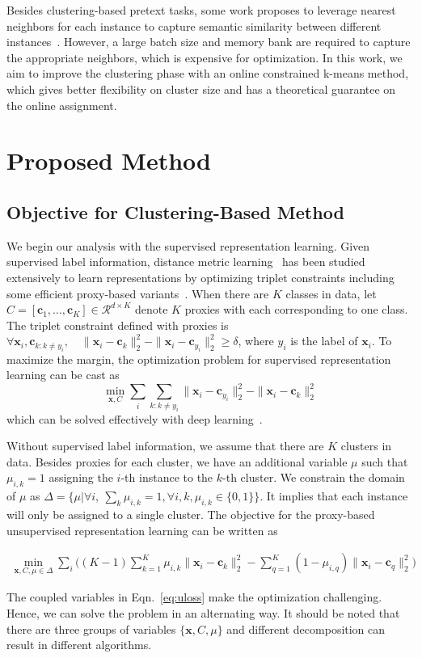 \documentclass[10pt,twocolumn,letterpaper]{article}
\def \R {\mathcal{R}}
\def \x {\mathbf{x}}
\def \cc {\mathbf{c}}
\begin{document}
Besides clustering-based pretext tasks, some work proposes to leverage nearest neighbors for each instance to capture semantic similarity between different instances~\cite{abs-2104-14548}. However, a large batch size and memory bank are required to capture the appropriate neighbors, which is expensive for optimization. In this work, we aim to improve the clustering phase with an online constrained k-means method, which gives better flexibility on cluster size and has a theoretical guarantee on the online assignment. 


\section{Proposed Method}\label{sec:method}

\subsection{Objective for Clustering-Based Method}
We begin our analysis with the supervised representation learning. Given supervised label information, distance metric learning~\cite{WeinbergerS09} has been studied extensively to learn representations by optimizing triplet constraints including some efficient proxy-based variants~\cite{Attias17,QianSSHTLJ19,QianTLZJ18}. 
When there are $K$ classes in data, let $C = [\cc_1,\dots, \cc_K]\in\R^{d\times K}$ denote $K$ proxies with each corresponding to one class. 
The triplet constraint defined with proxies is $\forall \x_i,\cc_{k: k\not= y_i},\quad \|\x_i- \cc_k\|_2^2 - \|\x_i-\cc_{y_i}\|_2^2\geq \delta$, where $y_i$ is the label of $\x_i$. To maximize the margin, the optimization problem for supervised representation learning can be cast as
\begin{equation}\label{eq:supervised}
\min_{\x, C}  \sum_{i}\sum_{k:k\not=y_i} \|\x_i-\cc_{y_i}\|_2^2 -  \|\x_i-\cc_k\|_2^2
\end{equation}
which can be solved effectively with deep learning~\cite{QianSSHTLJ19}.

Without supervised label information, we assume that there are $K$ clusters in data. Besides proxies for each cluster, we have an additional variable $\mu$ such that $\mu_{i,k}=1$ assigning the $i$-th instance to the $k$-th cluster. We constrain the domain of $\mu$ as $\Delta=\{\mu|\forall i,\ \sum_{k}\mu_{i,k}=1,\forall i,k, \mu_{i,k}\in\{0,1\}\}$. It implies that each instance will only be assigned to a single cluster. The objective for the proxy-based unsupervised representation learning can be written as
\begin{scriptsize}
\begin{align}\label{eq:uloss}
\min_{\x, C, \mu\in\Delta}  \sum_{i}\Big((K-1)\sum_{k=1}^K \mu_{i,k}\|\x_i-\cc_k\|_2^2 -  \sum_{q=1}^K(1-\mu_{i,q})\|\x_i-\cc_q\|_2^2\Big)
\end{align}
\end{scriptsize}
The coupled variables in Eqn.~\ref{eq:uloss} make the optimization challenging. Hence, we can solve the problem in an alternating way. It should be noted that there are three groups of variables $\{\x, C, \mu\}$ and different decomposition can result in different algorithms.
\end{document}
